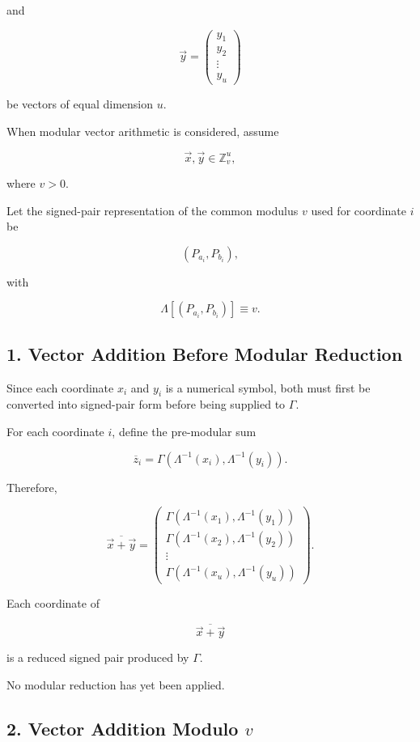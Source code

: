 \documentclass[12pt]{article}
\begin{document}
and

\[
\vec{y}
=
\begin{pmatrix}
y_1\\
y_2\\
\vdots\\
y_u
\end{pmatrix}
\]

be vectors of equal dimension \(u\).

When modular vector arithmetic is considered, assume

\[
\vec{x},\vec{y}\in\mathbb Z_v^u,
\]

where \(v>0\).

Let the signed-pair representation of the common modulus \(v\) used for coordinate \(i\) be

\[
(P_{a_i},P_{b_i}),
\]

with

\[
\boxed{
\Lambda[(P_{a_i},P_{b_i})]\equiv v.
}
\]

\subsection*{1. Vector Addition Before Modular Reduction}

Since each coordinate \(x_i\) and \(y_i\) is a numerical symbol, both must first be converted into signed-pair form before being supplied to \(\Gamma\).

For each coordinate \(i\), define the pre-modular sum

\[
\boxed{
\overline{z}_i
=
\Gamma
\left(
\Lambda^{-1}(x_i),
\Lambda^{-1}(y_i)
\right).
}
\]

Therefore,

\[
\boxed{
\overline{\vec{x}+\vec{y}}
=
\begin{pmatrix}
\Gamma
\left(
\Lambda^{-1}(x_1),
\Lambda^{-1}(y_1)
\right)
\\[8pt]
\Gamma
\left(
\Lambda^{-1}(x_2),
\Lambda^{-1}(y_2)
\right)
\\
\vdots
\\
\Gamma
\left(
\Lambda^{-1}(x_u),
\Lambda^{-1}(y_u)
\right)
\end{pmatrix}.
}
\]

Each coordinate of

\[
\overline{\vec{x}+\vec{y}}
\]

is a reduced signed pair produced by \(\Gamma\).

No modular reduction has yet been applied.

\subsection*{2. Vector Addition Modulo \(v\)}
\end{document}
